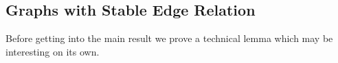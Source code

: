 \documentclass[a4paper]{amsart}
\theoremstyle{plain}
\theoremstyle{definition}
\theoremstyle{remark}
\numberwithin{equation}{section}
\newcommand{\forkindep}[1][]{%
  \mathrel{
    \mathop{
      \vcenter{
        \hbox{\oalign{\noalign{\kern-.3ex}\hfil$\vert$\hfil\cr
              \noalign{\kern-.7ex}
              $\smile$\cr\noalign{\kern-.3ex}}}
      }
    }\displaylimits_{#1}
  }
}
\DeclareMathOperator{\Sk}{Sk}
\begin{document}
%


\subsection{Graphs with Stable Edge Relation}
Before getting into the main result we prove a technical lemma which may be interesting on its own.
\end{document}
